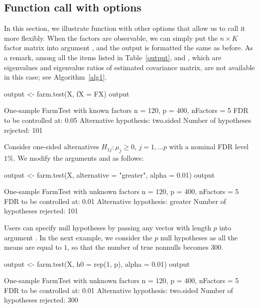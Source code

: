 



\subsection{Function call with options} \label{demo2}

In this section, we illustrate  function with other options that allow us to call it more flexibly.
When the factors are observable, we can simply put the $n\times K$ factor matrix into argument , and the output is formatted the same as before. As a remark, among all the items listed in Table~\ref{output},  and , which are eigenvalues and eigenvalue ratios of estimated covariance matrix, are not available in this case; see Algorithm~\ref{alg1}.

\begin{example*}
output <- farm.test(X, fX = FX)
output

One-sample FarmTest with known factors
n = 120, p = 400, nFactors = 5
FDR to be controlled at: 0.05
Alternative hypothesis: two.sided
Number of hypotheses rejected: 101
\end{example*}


Consider one-sided alternatives $H_{1j}: \mu_j \geq 0$, $j=1, \ldots p$ with a nominal FDR level $1\%$. We modify the arguments  and  as follows:


\begin{example*}
output <- farm.test(X, alternative = "greater", alpha = 0.01)
output

One-sample FarmTest with unknown factors
n = 120, p = 400, nFactors = 5
FDR to be controlled at: 0.01
Alternative hypothesis: greater
Number of hypotheses rejected: 101
\end{example*}



Users can specify null hypotheses by passing any vector with length $p$ into argument . In the next example, we consider the $p$ null hypotheses as all the means are equal to $1$, so that the number of true nonnulls becomes $300$.


\begin{example*}
output <- farm.test(X, h0 = rep(1, p), alpha = 0.01)
output

One-sample FarmTest with unknown factors
n = 120, p = 400, nFactors = 5
FDR to be controlled at: 0.01
Alternative hypothesis: two.sided
Number of hypotheses rejected: 300
\end{example*}


